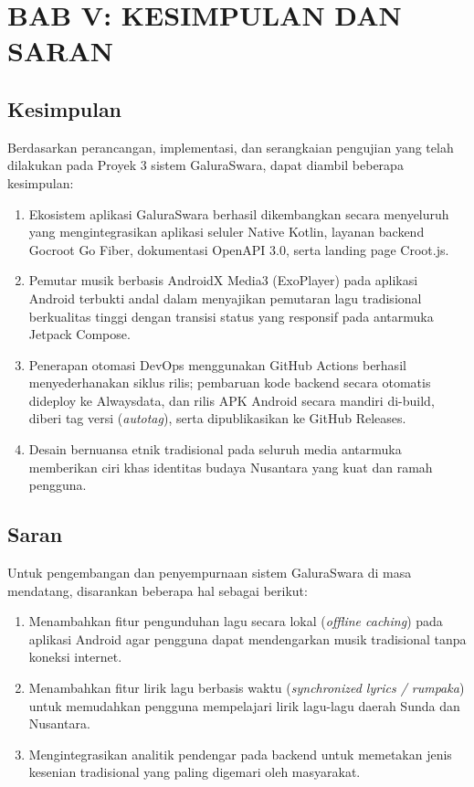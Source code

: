 \section{BAB V: KESIMPULAN DAN SARAN}

\subsection{Kesimpulan}
Berdasarkan perancangan, implementasi, dan serangkaian pengujian yang telah dilakukan pada Proyek 3 sistem GaluraSwara, dapat diambil beberapa kesimpulan:
\begin{enumerate}
    \item Ekosistem aplikasi GaluraSwara berhasil dikembangkan secara menyeluruh yang mengintegrasikan aplikasi seluler Native Kotlin, layanan backend Gocroot Go Fiber, dokumentasi OpenAPI 3.0, serta landing page Croot.js.
    \item Pemutar musik berbasis AndroidX Media3 (ExoPlayer) pada aplikasi Android terbukti andal dalam menyajikan pemutaran lagu tradisional berkualitas tinggi dengan transisi status yang responsif pada antarmuka Jetpack Compose.
    \item Penerapan otomasi DevOps menggunakan GitHub Actions berhasil menyederhanakan siklus rilis; pembaruan kode backend secara otomatis dideploy ke Alwaysdata, dan rilis APK Android secara mandiri di-build, diberi tag versi (\textit{autotag}), serta dipublikasikan ke GitHub Releases.
    \item Desain bernuansa etnik tradisional pada seluruh media antarmuka memberikan ciri khas identitas budaya Nusantara yang kuat dan ramah pengguna.
\end{enumerate}

\subsection{Saran}
Untuk pengembangan dan penyempurnaan sistem GaluraSwara di masa mendatang, disarankan beberapa hal sebagai berikut:
\begin{enumerate}
    \item Menambahkan fitur pengunduhan lagu secara lokal (\textit{offline caching}) pada aplikasi Android agar pengguna dapat mendengarkan musik tradisional tanpa koneksi internet.
    \item Menambahkan fitur lirik lagu berbasis waktu (\textit{synchronized lyrics / rumpaka}) untuk memudahkan pengguna mempelajari lirik lagu-lagu daerah Sunda dan Nusantara.
    \item Mengintegrasikan analitik pendengar pada backend untuk memetakan jenis kesenian tradisional yang paling digemari oleh masyarakat.
\end{enumerate}

